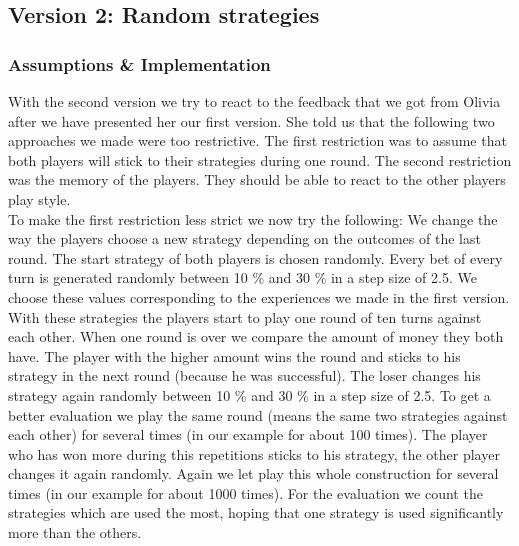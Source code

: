 \documentclass[11pt]{article}
\begin{document}
\subsection{Version 2: Random strategies}
\subsubsection{Assumptions \& Implementation}
With the second version we try to react to the feedback that we got from Olivia after we have presented her our first version. She told us that the following two approaches we made were too restrictive. The first restriction was to assume that both players will stick to their strategies during one round. The second restriction was the memory of the players. They should be able to react to the other players play style.\\
To make the first restriction less strict we now try the following: We change the way the players choose a new strategy depending on the outcomes of the last round.
The start strategy of both players is chosen randomly. Every bet of every turn is generated randomly between 10 \% and 30 \% in a step size of 2.5. We choose these values corresponding to the experiences we made in the first version. With these strategies the players start to play one round of ten turns against each other. When one round is over we compare the amount of money they both have. The player with the higher amount wins the round and sticks to his strategy in the next round (because he was successful). The loser changes his strategy again randomly between 10 \% and 30 \% in a step size of 2.5. 
To get a better evaluation we play the same round (means the same two strategies against each other) for several times (in our example for about 100 times). The player who has won more during this repetitions sticks to his strategy, the other player changes it again randomly. Again we let play this whole construction for several times (in our example for about 1000 times).
For the evaluation we count the strategies which are used the most, hoping that one strategy is used significantly more than the others.
\end{document}
